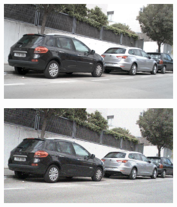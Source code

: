 \documentclass[a4paper]{ctexart}
\begin{document}
\begin{figure}[htbp]
\begin{subfigure}{0.08\textwidth}
			\label{fig：Gamma=0.8, Gauss Noise = 1.0}
		\end{subfigure} \\
		
		\vspace{-15pt}
		
		\begin{subfigure}{0.02\textwidth}
			\captionsetup{font=scriptsize}
			\caption*{}
			\vspace{-2pt}
		\end{subfigure}
		\begin{subfigure}{0.08\textwidth}
			\captionsetup{font=scriptsize}
			\includegraphics[width=\linewidth]{picture/Edge Detection/degrade/RGB_001 Gamma=0.9, Gauss Noise=0.0}
			\label{fig: Gamma=0.9, Gauss Noise = 0.0}
		\end{subfigure}
		\begin{subfigure}{0.08\textwidth}
			\captionsetup{font=scriptsize}
			\includegraphics[width=\linewidth]{picture/Edge Detection/degrade/RGB_001 Gamma=0.9, Gauss Noise=0.1}

\end{subfigure}
\end{figure}
\end{document}
